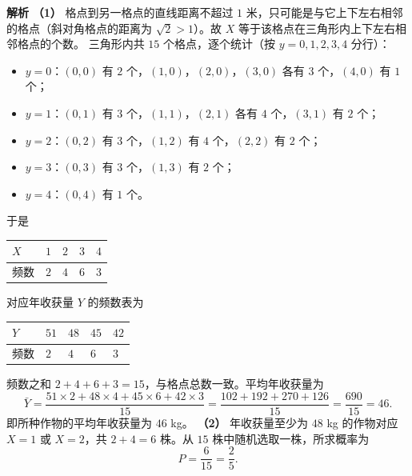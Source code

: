 \begin{answer}
\textbf{解析}
\textbf{（1）} 格点到另一格点的直线距离不超过 $1$ 米，只可能是与它上下左右相邻的格点（斜对角格点的距离为 $\sqrt2>1$）。故 $X$ 等于该格点在三角形内上下左右相邻格点的个数。
三角形内共 $15$ 个格点，逐个统计（按 $y=0,1,2,3,4$ 分行）：
\begin{itemize}
\item $y=0$：$(0,0)$ 有 $2$ 个，$(1,0)$，$(2,0)$，$(3,0)$ 各有 $3$ 个，$(4,0)$ 有 $1$ 个；
\item $y=1$：$(0,1)$ 有 $3$ 个，$(1,1)$，$(2,1)$ 各有 $4$ 个，$(3,1)$ 有 $2$ 个；
\item $y=2$：$(0,2)$ 有 $3$ 个，$(1,2)$ 有 $4$ 个，$(2,2)$ 有 $2$ 个；
\item $y=3$：$(0,3)$ 有 $3$ 个，$(1,3)$ 有 $2$ 个；
\item $y=4$：$(0,4)$ 有 $1$ 个。
\end{itemize}
于是
\begin{center}
\begin{tabular}{lllll}
\toprule
$X$ & $1$ & $2$ & $3$ & $4$ \\
\midrule
频数 & $2$ & $4$ & $6$ & $3$ \\
\bottomrule
\end{tabular}
\end{center}
对应年收获量 $Y$ 的频数表为
\begin{center}
\begin{tabular}{lllll}
\toprule
$Y$ & $51$ & $48$ & $45$ & $42$ \\
\midrule
频数 & $2$ & $4$ & $6$ & $3$ \\
\bottomrule
\end{tabular}
\end{center}
频数之和 $2+4+6+3=15$，与格点总数一致。平均年收获量为
\nopagebreak[4]
\[\bar Y=\frac{51\times2+48\times4+45\times6+42\times3}{15}=\frac{102+192+270+126}{15}=\frac{690}{15}=46.\]
即所种作物的平均年收获量为 $46$ kg。
\textbf{（2）} 年收获量至少为 $48$ kg 的作物对应 $X=1$ 或 $X=2$，共 $2+4=6$ 株。从 $15$ 株中随机选取一株，所求概率为
\nopagebreak[4]
\[P=\frac6{15}=\frac25.\]



\end{answer}
